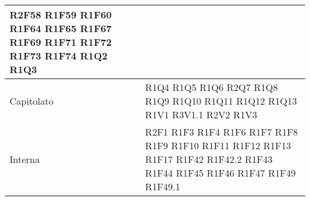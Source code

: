 \begin{center}
\begin{longtable}{|p{44mm}|p{22mm}|}
R2F58 \newline
R1F59 \newline
R1F60 \newline
R1F64 \newline
R1F65 \newline
R1F67 \newline
R1F69 \newline
R1F71 \newline
R1F72 \newline
R1F73 \newline
R1F74 \newline
R1Q2 \newline
R1Q3
\\
\hline
Capitolato &R1Q4 \newline
R1Q5 \newline
R1Q6 \newline
R2Q7 \newline
R1Q8 \newline
R1Q9 \newline
R1Q10 \newline
R1Q11 \newline
R1Q12 \newline
R1Q13 \newline
R1V1 \newline
R3V1.1 \newline
R2V2 \newline
R1V3 
\\
\hline
Interna &
R2F1 \newline
R1F3 \newline
R1F4 \newline
R1F6 \newline
R1F7 \newline
R1F8 \newline
R1F9 \newline
R1F10 \newline
R1F11 \newline
R1F12 \newline
R1F13 \newline
R1F17 \newline
R1F42 \newline
R1F42.2 \newline
R1F43 \newline
R1F44 \newline
R1F45 \newline
R1F46 \newline
R1F47 \newline
R1F49 \newline
R1F49.1 \newline

\end{longtable}
\end{center}
